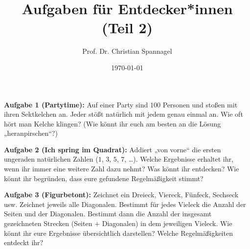 \documentclass{../cssheet}
\title{Aufgaben für Entdecker*innen (Teil 2)}
\author{Prof. Dr. Christian Spannagel}
\date{\today}
\begin{document}
\printtitle

\textbf{Aufgabe 1 (Partytime):}  Auf einer Party sind $100$ Personen und stoßen mit ihren Sektkelchen an. Jeder stößt natürlich mit jedem genau einmal an. Wie oft hört man Kelche klingen? (Wie könnt ihr euch am besten an die Lösung „heranpirschen“?) 

\textbf{Aufgabe 2 (Ich spring im Quadrat):} Addiert „von vorne“ die ersten ungeraden natürlichen Zahlen ($1$, $3$, $5$, $7$, …). Welche Ergebnisse erhaltet ihr, wenn ihr immer eine weitere Zahl dazu nehmt? Was könnt ihr entdecken? Wie könnt ihr begründen, dass eure gefundene Regelmäßigkeit stimmt? 

\textbf{Aufgabe 3 (Figurbetont):}  Zeichnet ein Dreieck, Viereck, Fünfeck, Sechseck usw. Zeichnet jeweils alle Diagonalen. Bestimmt für jedes Vieleck die Anzahl der Seiten und der Diagonalen. Bestimmt dann die Anzahl der insgesamt gezeichneten Strecken (Seiten $+$ Diagonalen) in dem jeweiligen Vieleck. Wie könnt ihr eure Ergebnisse übersichtlich darstellen? Welche Regelmäßigkeiten entdeckt ihr? 


\vspace*{10mm}

\printlicense

\printsocials
\end{document}
